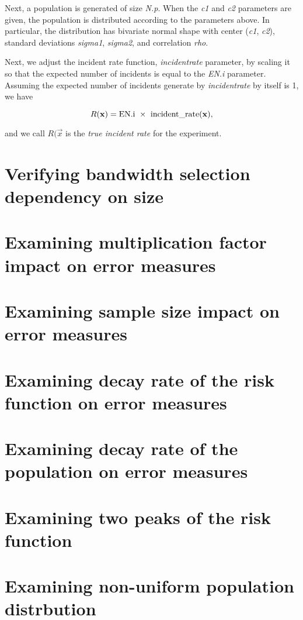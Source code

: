 Next, a population is generated of size \textit{N.p}.
When the \textit{c1} and \textit{c2} parameters are given, the population is distributed according to the parameters above.
In particular, the distribution has bivariate normal shape with center (\textit{c1}, \textit{c2}),
standard deviations \textit{sigma1}, \textit{sigma2}, and correlation \textit{rho}.

Next, we adjust the incident rate function, \textit{incident\textunderscore rate} parameter, by scaling it so that the expected number of incidents is equal to the \textit{EN.i} parameter.
Assuming the expected number of incidents generate by \textit{incident\textunderscore rate} by itself is 1, we have

\[
    R(\vec{x}) = \mbox{EN.i}~\times~\mbox{incident\textunderscore rate}(\vec{x}) \text{,}
\]

and we call \(R(\vec{x}\) is the \textit{true incident rate} for the experiment.

\section{Verifying bandwidth selection dependency on size}

\section{Examining multiplication factor impact on error measures}

\section{Examining sample size impact on error measures}

\section{Examining decay rate of the risk function on error measures}

\section{Examining decay rate of the population on error measures}

\section{Examining two peaks of the risk function}

\section{Examining non-uniform population distrbution}